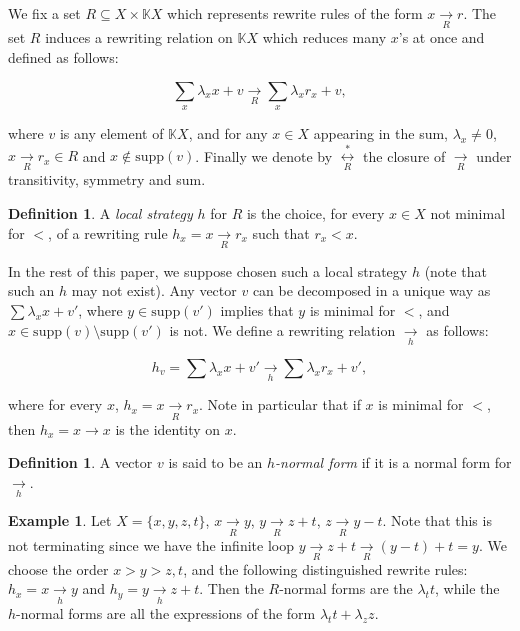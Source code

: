 \documentclass[10pt]{easychair}
\theoremstyle{definition}
\newtheorem{definition}[theorem]{Definition}
\newtheorem{example}[theorem]{Example}
\newcommand\K{\mathbb{K}}
\newcommand\KX{\K X}
\newcommand\supp{\text{supp}}
\newcommand\rewR{\underset{R}{\longrightarrow}}
\newcommand\rewh{\underset{h}{\longrightarrow}}
\newcommand\equivR{\underset{R}{\overset{*}{\longleftrightarrow}}}
\begin{document}
\medskip

We fix a set $R\subseteq X\times\KX$ which represents rewrite rules of
the form $x\rewR r$. The set $R$ induces a rewriting relation on $\KX$ which reduces many $x$'s at once and defined as follows:
\begin{small}
  \begin{equation}\label{equ:rewriting_step}
    \sum_x\lambda_xx+v\rewR\sum_x\lambda_xr_x+v,
  \end{equation}
\end{small}
where $v$ is any element of $\KX$, and for any $x \in X$ appearing in the sum,  $\lambda_x\neq 0$, $x\rewR r_x\in R$ and $x\notin\supp(v)$.
Finally we denote by $\equivR$ the closure of $\rewR$ under transitivity, symmetry and sum.

\begin{definition}
  A \emph{local strategy} $h$ for $R$ is the choice, for every $x \in X$ not minimal for $<$, of a rewriting rule $h_x=x \rewR r_x$ such that $r_x < x$. 
\end{definition}

In the rest of this paper, we suppose chosen such a local strategy $h$ (note that such an $h$ may not exist). 
Any vector $v$ can be decomposed in a unique way as
$\sum\lambda_xx+v'$, where $y\in\supp(v')$ implies that $y$ is minimal
for $<$, and $x\in\supp(v)\setminus\supp(v')$ is not. We define a rewriting
relation $\rewh$ as follows:
\begin{small}
  \begin{equation}\label{equ:well-formed_rewriting_step}
    h_v = \sum\lambda_xx+v'\rewh\sum\lambda_xr_x+v',
  \end{equation}
\end{small}
where for every $x$, $h_x=x \rewR r_x$. Note in particular that if $x$ is minimal for $<$, then $h_x = x \to x$ is the identity on $x$.

\medskip

\begin{definition}
  A vector $v$ is said to be an \emph{$h$-normal form} if it is a normal
  form for $\rewh$.
\end{definition}


\begin{example}\label{ex:h_norma_form}
  Let $X=\{x,y,z,t\}$, $x\rewR y$, $y \rewR z + t$, $z \rewR y - t$. Note that this is not terminating since we have the infinite loop $y \rewR z + t \rewR (y - t) + t = y$. We choose the order $x > y > z,t$, and the following distinguished rewrite rules: $h_x = x \rewh y$ and $h_y = y \rewh z + t$. Then the $R$-normal forms are the $\lambda_t t$, while the $h$-normal forms are all the expressions of the form $\lambda_t t + \lambda_z z$.
\end{example}
\end{document}
